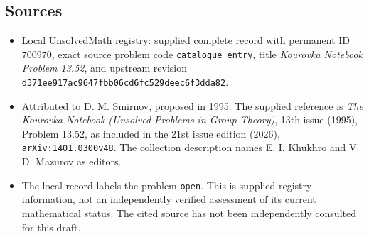 \documentclass[11pt]{article}
\begin{document}
\subsection{Sources}
\begin{itemize}
\item Local UnsolvedMath registry: supplied complete record with permanent ID \(700970\), exact source problem code \texttt{catalogue entry}, title \emph{Kourovka Notebook Problem 13.52}, and upstream revision \texttt{d371ee917ac9647fbb06cd6fc529deec6f3dda82}.
\item Attributed to D. M. Smirnov, proposed in 1995. The supplied reference is \emph{The Kourovka Notebook (Unsolved Problems in Group Theory)}, 13th issue (1995), Problem 13.52, as included in the 21st issue edition (2026), \texttt{arXiv:1401.0300v48}. The collection description names E. I. Khukhro and V. D. Mazurov as editors.
\item The local record labels the problem \texttt{open}. This is supplied registry information, not an independently verified assessment of its current mathematical status. The cited source has not been independently consulted for this draft.
\end{itemize}
\end{document}
